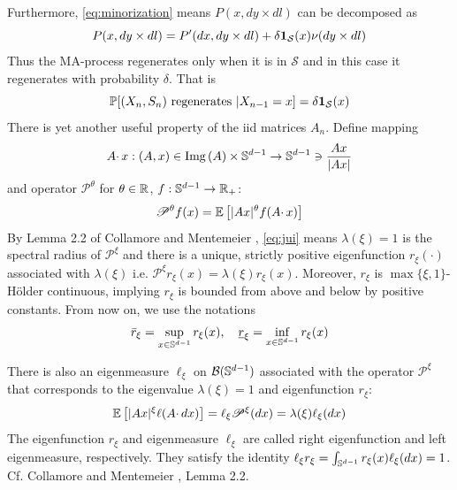 \documentclass[aoas,preprint]{imsart}
\numberwithin{equation}{section}
\theoremstyle{plain}
\begin{document}
Furthermore, \eqref{eq:minorization} means
$P(x, dy \times dl)$ can be decomposed as
\[
P(x, dy \times dl) = P'(dx, dy \times dl)
+
\delta \mathbf{1}_{\mathcal S}(x) \nu(dy \times dl)
\]
Thus the MA-process regenerates only when it is in $\mathcal S$ and in
this case it regenerates with probability $\delta$. That is
\[
\mathbb{P}[(X_n, S_n) \text{ regenerates } | X_{n-1} = x] = \delta \mathbf{1}_{\mathcal S}(x)
\]
There is yet another useful property of the iid matrices $A_n$. Define
mapping
\[
A \cdotp x: (A, x) \in \text{Img}\,(A) \times \mathbb S^{d-1} \to
\mathbb S^{d-1} \ni {
  A x \over |A x|
}
\]
and operator $\mathscr P^\theta$ for $\theta \in \mathbb R$,
$f: \mathbb S^{d-1} \to \mathbb R_+$:
\[
\mathscr P^\theta f(x) =
\mathbb{E} \left[
  |A x|^\theta f(A \cdotp x)
\right]
\]
By Lemma 2.2 of Collamore and Mentemeier
\cite{collamore:mentemeier:2016}, \eqref{eq:jui} means
$\lambda(\xi) = 1$ is the spectral radius of $\mathscr P^\xi$ and
there is a unique, strictly positive eigenfunction $r_\xi(\cdot)$
associated with $\lambda(\xi)$ i.e.
$\mathscr P^\xi r_\xi(x) = \lambda(\xi) r_\xi(x)$.
Moreover, $r_\xi$ is $\max\{\xi, 1\}$-H\"older continuous, implying
$r_\xi$ is bounded from above and below by positive constants. From
now on, we use the notations
\[
\bar r_\xi = \sup_{x \in \mathbb S^{d-1}} r_\xi(x),\quad
\underline r_\xi = \inf_{x \in \mathbb S^{d-1}} r_\xi(x)
\]

There is also an eigenmeasure $\ell_\xi$ on $\mathcal B(\mathbb S^{d-1})$
associated with the operator $\mathscr P^\xi$ that corresponds to the
eigenvalue $\lambda(\xi) = 1$ and eigenfunction $r_\xi$:
\begin{equation}
  \label{eq:eigenmeasure}
  \mathbb{E} \left[ |A x|^\xi \ell(A \cdotp dx) \right]
  = \ell_\xi \mathscr P^\xi (dx)
  = \lambda(\xi) \ell_\xi(dx)
\end{equation}
The eigenfunction $r_\xi$ and eigenmeasure $\ell_\xi$ are called
right eigenfunction and left eigenmeasure, respectively. They
satisfy the identity
$\ell_\xi r_\xi = \int_{\mathbb S^{d-1}} r_\xi(x) \ell_\xi(dx) = 1$.
Cf. Collamore and Mentemeier \cite{collamore:mentemeier:2016},
Lemma 2.2.
\end{document}
